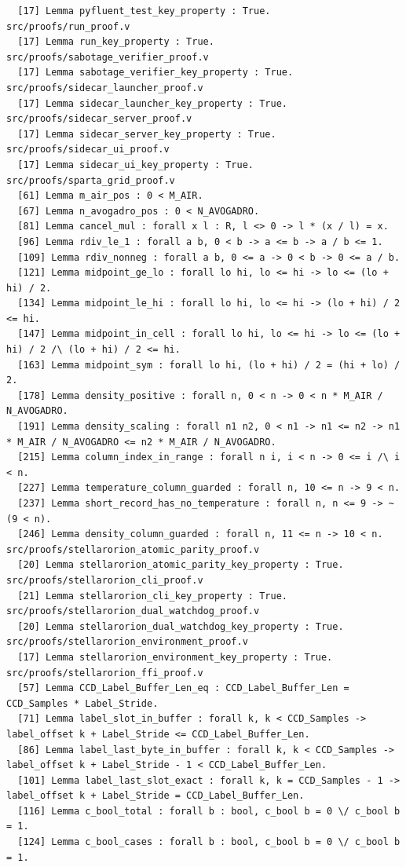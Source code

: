 \documentclass[11pt]{article}
\theoremstyle{definition}
\begin{document}
\begin{verbatim}
  [17] Lemma pyfluent_test_key_property : True.
src/proofs/run_proof.v
  [17] Lemma run_key_property : True.
src/proofs/sabotage_verifier_proof.v
  [17] Lemma sabotage_verifier_key_property : True.
src/proofs/sidecar_launcher_proof.v
  [17] Lemma sidecar_launcher_key_property : True.
src/proofs/sidecar_server_proof.v
  [17] Lemma sidecar_server_key_property : True.
src/proofs/sidecar_ui_proof.v
  [17] Lemma sidecar_ui_key_property : True.
src/proofs/sparta_grid_proof.v
  [61] Lemma m_air_pos : 0 < M_AIR.
  [67] Lemma n_avogadro_pos : 0 < N_AVOGADRO.
  [81] Lemma cancel_mul : forall x l : R, l <> 0 -> l * (x / l) = x.
  [96] Lemma rdiv_le_1 : forall a b, 0 < b -> a <= b -> a / b <= 1.
  [109] Lemma rdiv_nonneg : forall a b, 0 <= a -> 0 < b -> 0 <= a / b.
  [121] Lemma midpoint_ge_lo : forall lo hi, lo <= hi -> lo <= (lo + hi) / 2.
  [134] Lemma midpoint_le_hi : forall lo hi, lo <= hi -> (lo + hi) / 2 <= hi.
  [147] Lemma midpoint_in_cell : forall lo hi, lo <= hi -> lo <= (lo + hi) / 2 /\ (lo + hi) / 2 <= hi.
  [163] Lemma midpoint_sym : forall lo hi, (lo + hi) / 2 = (hi + lo) / 2.
  [178] Lemma density_positive : forall n, 0 < n -> 0 < n * M_AIR / N_AVOGADRO.
  [191] Lemma density_scaling : forall n1 n2, 0 < n1 -> n1 <= n2 -> n1 * M_AIR / N_AVOGADRO <= n2 * M_AIR / N_AVOGADRO.
  [215] Lemma column_index_in_range : forall n i, i < n -> 0 <= i /\ i < n.
  [227] Lemma temperature_column_guarded : forall n, 10 <= n -> 9 < n.
  [237] Lemma short_record_has_no_temperature : forall n, n <= 9 -> ~ (9 < n).
  [246] Lemma density_column_guarded : forall n, 11 <= n -> 10 < n.
src/proofs/stellarorion_atomic_parity_proof.v
  [20] Lemma stellarorion_atomic_parity_key_property : True.
src/proofs/stellarorion_cli_proof.v
  [21] Lemma stellarorion_cli_key_property : True.
src/proofs/stellarorion_dual_watchdog_proof.v
  [20] Lemma stellarorion_dual_watchdog_key_property : True.
src/proofs/stellarorion_environment_proof.v
  [17] Lemma stellarorion_environment_key_property : True.
src/proofs/stellarorion_ffi_proof.v
  [57] Lemma CCD_Label_Buffer_Len_eq : CCD_Label_Buffer_Len = CCD_Samples * Label_Stride.
  [71] Lemma label_slot_in_buffer : forall k, k < CCD_Samples -> label_offset k + Label_Stride <= CCD_Label_Buffer_Len.
  [86] Lemma label_last_byte_in_buffer : forall k, k < CCD_Samples -> label_offset k + Label_Stride - 1 < CCD_Label_Buffer_Len.
  [101] Lemma label_last_slot_exact : forall k, k = CCD_Samples - 1 -> label_offset k + Label_Stride = CCD_Label_Buffer_Len.
  [116] Lemma c_bool_total : forall b : bool, c_bool b = 0 \/ c_bool b = 1.
  [124] Lemma c_bool_cases : forall b : bool, c_bool b = 0 \/ c_bool b = 1.

\end{verbatim}
\end{document}
